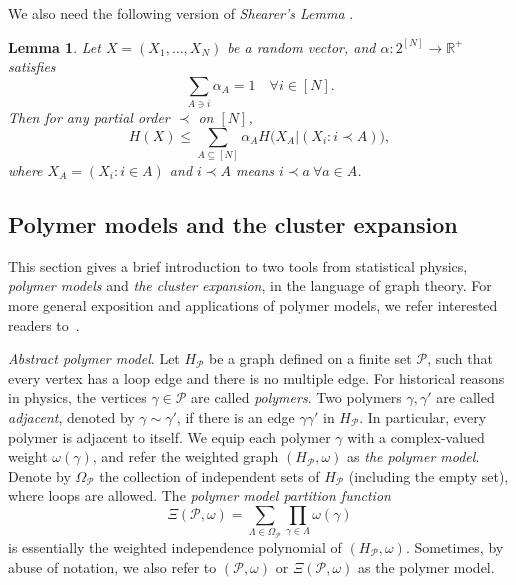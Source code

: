 \documentclass{amsart}
\newtheorem{lem}[thm]{Lemma}
\theoremstyle{definition}
\newcommand{\we}{\omega}
\newcommand{\cP}{\mathcal{P} }
\newcommand{\beq}[1]{\begin{equation}\label{#1}}
\newcommand{\enq}[0]{\end{equation}}
\newcommand{\nin}[0]{\noindent}
\newcommand{\0}[0]{\emptyset}
\begin{document}
We also need the following version of \emph{Shearer's Lemma} \cite{Sh}.

\begin{lem}\label{lem:Sh}
Let $X=(X_1, \dots, X_N)$ be a random vector, and $\alpha:2^{[N]}\rightarrow \mathbb R^+$
satisfies
\beq{fractiling}
\sum_{A\ni i}\alpha_A =1 \quad \forall i\in [N].
\enq
Then for any partial order $\prec$ on $[N]$,
\beq{Shearer}
H(X)\leq \sum_{A\subseteq [N]}\alpha_AH\big(X_A|(X_i:i \prec A)\big),
\enq
where $X_A=(X_i:i\in A)$ and $i\prec A$ means $i\prec a\  \forall a\in A$.
\end{lem}



\subsection{Polymer models and the cluster expansion}\label{subsec.polymer intro} 
This section gives a brief introduction to two tools from statistical physics, \textit{polymer models} and \textit{the cluster expansion}, in the language of graph theory. For more general exposition and applications of polymer models, we refer interested readers to~\cite{fernandez2007cluster, JP, kotecky1986cluster}.
\vspace{5pt}

\nin \textit{Abstract polymer model}. 
Let $H_{\cP}$ be a graph  defined on a finite set $\cP$, such that every vertex has a loop edge and there is no multiple edge.
For historical reasons in physics, the vertices $\gamma \in \cP$ are called \textit{polymers}.
Two polymers $\gamma, \gamma'$ are called \textit{adjacent}, denoted by $\gamma\sim \gamma'$, if there is an edge $\gamma\gamma'$ in $H_{\cP}$.
In particular, every polymer is adjacent to itself.
We equip each polymer $\gamma$ with a complex-valued weight $\we(\gamma)$, and refer the weighted graph $(H_{\cP}, \we)$ as \textit{the polymer model}. 
Denote by $\Omega_{\cP}$ the collection of independent sets of $H_{\cP}$ (including the empty set), where loops are allowed.
The \textit{polymer model partition function} 
\begin{equation}\label{def:partitionfunction}
  \Xi(\cP, \we)=\sum_{\Lambda\in \Omega_{\cP}}\prod_{\gamma\in \Lambda}\we(\gamma)
\end{equation}
is essentially the weighted independence polynomial of $(H_{\cP}, \we)$.
Sometimes, by abuse of notation, we also refer to $(\cP,\we)$ or $\Xi(\cP, \we)$ as the polymer model.
\vspace{5pt}
\end{document}
